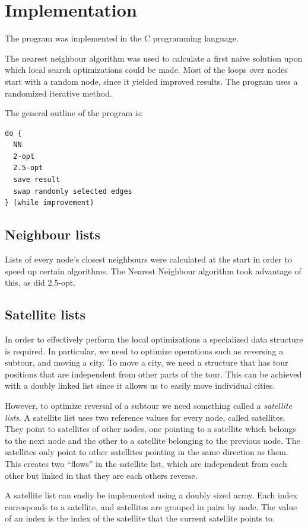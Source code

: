 \documentclass[paper=a4, fontsize=11pt,numbers=endperiod]{scrartcl} %
\numberwithin{equation}{section} %
\numberwithin{figure}{section} %
\numberwithin{table}{section} %
\begin{document}
\section{Implementation}
The program was implemented in the C programming language.

The nearest neighbour algorithm was used to calculate a first naive solution upon which local search optimizations could be made.
Most of the loops over nodes start with a random node, since it yielded improved results.
The program uses a randomized iterative method.

The general outline of the program is:

\begin{verbatim}
do {
  NN
  2-opt
  2.5-opt
  save result
  swap randomly selected edges
} (while improvement)
\end{verbatim}


\subsection{Neighbour lists}
Lists of every node's closest neighbours were calculated at the start in order to speed up certain algorithms.
The Nearest Neighbour algorithm took advantage of this, as did 2.5-opt.

\subsection{Satellite lists}
In order to effectively perform the local optimizations a specialized data structure is required.
In particular, we need to optimize operations such as reversing a subtour, and moving a city.
To move a city, we need a structure that has tour positions that are independent from other parts of the tour.
This can be achieved with a doubly linked list since it allows us to easily move individual cities.

However, to optimize reversal of a subtour we need something called a \emph{satellite lists}.\cite{satellite}
A satellite list uses two reference values for every node, called satellites.
They point to satellites of other nodes, one pointing to a satellite which belongs to the next node and the other to a satellite belonging to the previous node.
The satellites only point to other satellites pointing in the same direction as them.
This creates two ``flows'' in the satellite list, which are independent from each other but linked in that they are each others reverse.

A satellite list can easliy be implemented using a doubly sized array.
Each index corresponds to a satellite, and satellites are grouped in pairs by node.
The value of an index is the index of the satellite that the current satellite points to.
\end{document}
